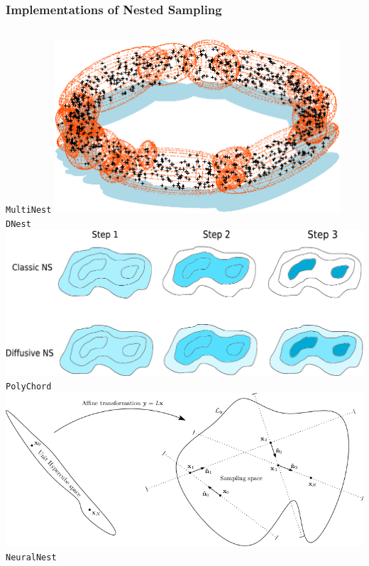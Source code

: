 \documentclass[aspectratio=169]{beamer}
\begin{document}
\begin{frame}
    \frametitle{Implementations of Nested Sampling}
    \begin{columns}
        \texttt{MultiNest}
        \includegraphics[width=0.8\textwidth]{figures/multinest}
        \vfill
        \texttt{DNest}
        \includegraphics[width=\textwidth]{figures/dnest}
        \texttt{PolyChord}
        \includegraphics[width=\textwidth]{figures/polychord}
        \vfill
        \texttt{NeuralNest}

\end{columns}
\end{frame}
\end{document}
